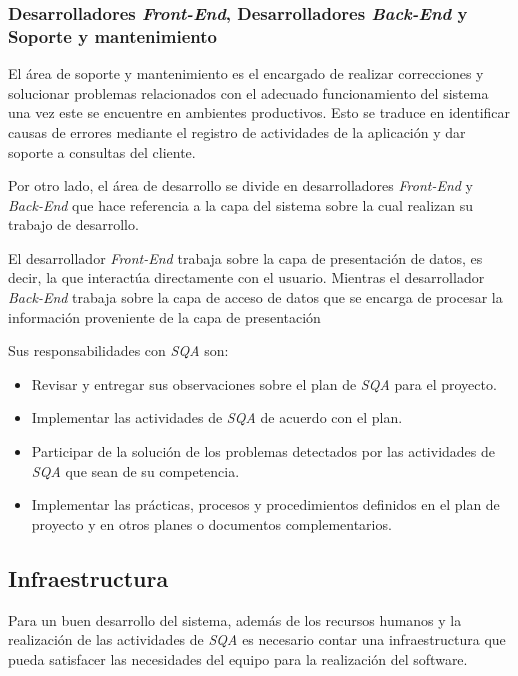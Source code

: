 \subsubsection{Desarrolladores \textit{Front-End}, Desarrolladores \textit{Back-End} y Soporte y mantenimiento}

El área de soporte y mantenimiento es el encargado de realizar correcciones y solucionar problemas relacionados con el adecuado funcionamiento del sistema una vez este se encuentre en ambientes productivos. Esto se traduce en identificar causas de errores mediante el registro de actividades de la aplicación y dar soporte a consultas del cliente.

Por otro lado, el área de desarrollo se divide en desarrolladores \textit{Front-End} y \textit{Back-End} que hace referencia a la capa del sistema sobre la cual realizan su trabajo de desarrollo. 

El desarrollador \textit{Front-End} trabaja sobre la capa de presentación de datos, es decir, la que interactúa directamente con el usuario. Mientras el desarrollador \textit{Back-End} trabaja sobre la capa de acceso de datos que se encarga de procesar la información proveniente de la capa de presentación

Sus responsabilidades con \textit{SQA} son: 

	\begin{itemize}
		\item
		Revisar y entregar sus observaciones sobre el plan de \textit{SQA} para el proyecto.
		\item
		Implementar las actividades de \textit{SQA} de acuerdo con el plan.
		\item
		Participar de la solución de los problemas detectados por las actividades de \textit{SQA} que sean de su competencia.
		\item
		Implementar las prácticas, procesos y procedimientos definidos en el plan de proyecto y en otros planes o documentos complementarios.
	\end{itemize}

\subsection{Infraestructura}
Para un buen desarrollo del sistema, además de los recursos humanos y la realización de las actividades de \textit{SQA} es necesario contar una infraestructura que pueda satisfacer las necesidades del equipo para la realización del software. 

